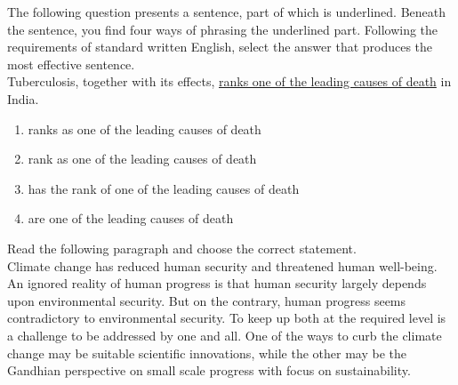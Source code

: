 \item The following question presents a sentence, part of which is underlined. Beneath the sentence, you find four ways of phrasing the underlined part. Following the requirements of standard written English, select the answer that produces the most effective sentence.\\
Tuberculosis, together with its effects, \underline{ranks one of the leading causes of death} in India.
\begin{enumerate}
    \item ranks as one of the leading causes of death
    \item rank as one of the leading causes of death
    \item has the rank of one of the leading causes of death
    \item are one of the leading causes of death
\end{enumerate}
\item Read the following paragraph and choose the correct statement.\\
    
    Climate change has reduced human security and threatened human well-being. An ignored reality of human progress is that human security largely depends upon environmental security. But on the contrary, human progress seems contradictory to environmental security. To keep up both at the required level is a challenge to be addressed by one and all. One of the ways to curb the climate change may be suitable scientific innovations, while the other may be the Gandhian perspective on small scale progress with focus on sustainability.
    
